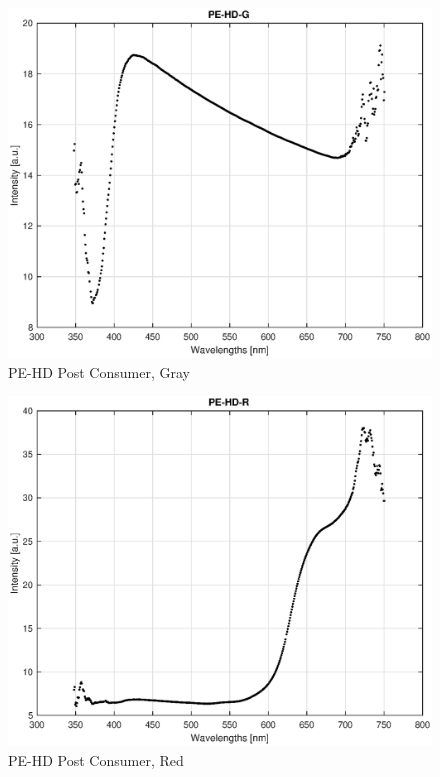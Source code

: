 \begin{appendices}
\begin{figure}
    \centering
    \includegraphics[width = 12cm]{Images/appendix/pe-hd-postconsum-gray.eps}
    \caption{PE-HD Post Consumer, Gray}
\end{figure}

\begin{figure}
    \centering
    \includegraphics[width = 12cm]{Images/appendix/pe-hd-postconsum-red.eps}
    \caption{PE-HD Post Consumer, Red}
\end{figure}


\end{appendices}
